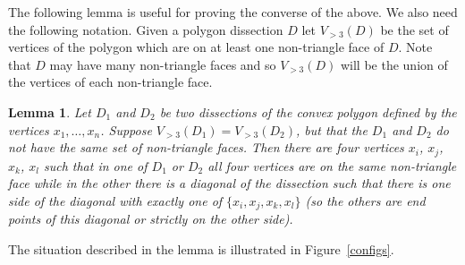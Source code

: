 \documentclass[11pt]{article}
\newtheorem{lem}[thm]{Lemma}
\theoremstyle{remark}
\theoremstyle{definition}
\begin{document}
The following lemma is useful for proving the converse of the above. We also need the following notation.  Given a polygon dissection $D$ let $V_{>3}(D)$ be the set of vertices of the polygon which are on at least one non-triangle face of $D$.  Note that $D$ may have many non-triangle faces and so $V_{>3}(D)$ will be the union of the vertices of each non-triangle face.

\begin{lem}\label{lem good quads}
  Let $D_1$ and $D_2$ be two dissections of the convex polygon defined by the vertices $x_1, \ldots, x_n$.  Suppose $V_{>3}(D_1) = V_{>3}(D_2)$, but that the $D_1$ and $D_2$ do not have the same set of non-triangle faces.  Then there are four vertices $x_i$, $x_j$, $x_k$, $x_l$ such that in one of $D_1$ or $D_2$ all four vertices are on the same non-triangle face while in the other there is a diagonal of the dissection such that there is one side of the diagonal with exactly one of $\{x_i, x_j, x_k, x_l\}$ (so the others are end points of this diagonal or strictly on the other side).
\end{lem} 

The situation described in the lemma is illustrated in Figure~\ref{configs}.
\end{document}
